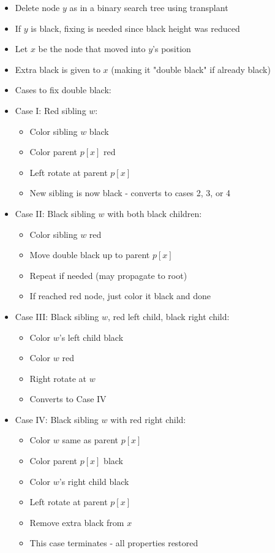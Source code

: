 \begin{itemize}
    \item Delete node \(y\) as in a binary search tree using transplant
    \item If \(y\) is black, fixing is needed since black height was reduced
    \item Let \(x\) be the node that moved into \(y\)'s position
    \item Extra black is given to \(x\) (making it "double black" if already black)
    \item Cases to fix double black:
    \item Case I: Red sibling \(w\):
        \begin{itemize}
            \item Color sibling \(w\) black
            \item Color parent \(p[x]\) red
            \item Left rotate at parent \(p[x]\)
            \item New sibling is now black - converts to cases 2, 3, or 4
        \end{itemize}
    \item Case II: Black sibling \(w\) with both black children:
        \begin{itemize}
            \item Color sibling \(w\) red
            \item Move double black up to parent \(p[x]\)
            \item Repeat if needed (may propagate to root)
            \item If reached red node, just color it black and done
        \end{itemize}
    \item Case III: Black sibling \(w\), red left child, black right child:
        \begin{itemize}
            \item Color \(w\)'s left child black
            \item Color \(w\) red
            \item Right rotate at \(w\)
            \item Converts to Case IV
        \end{itemize}
    \item Case IV: Black sibling \(w\) with red right child:
        \begin{itemize}
            \item Color \(w\) same as parent \(p[x]\)
            \item Color parent \(p[x]\) black
            \item Color \(w\)'s right child black
            \item Left rotate at parent \(p[x]\)
            \item Remove extra black from \(x\)
            \item This case terminates - all properties restored
        \end{itemize}
\end{itemize}

